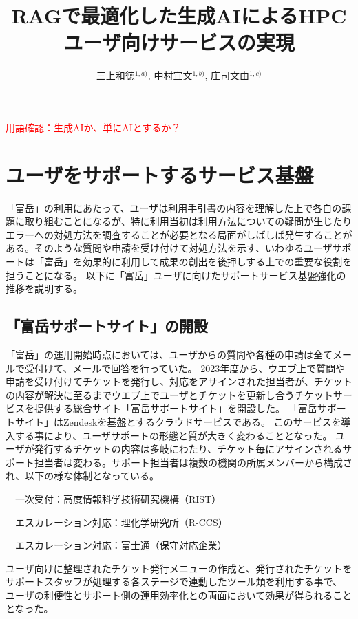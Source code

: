 \documentclass{jsaxiesproc}
\title{
	RAGで最適化した生成AIによるHPCユーザ向けサービスの実現
}
\author{
三上和徳$^{1,a)}$,
中村宜文$^{1,b)}$,
庄司文由$^{1,c)}$
}
\affiliation{
1) 理化学研究所 計算科学研究センター
}
\begin{document}
\maketitle


\textcolor{red}{
用語確認：生成AIか、単にAIとするか？
}



\section{ユーザをサポートするサービス基盤}
「富岳」の利用にあたって、ユーザは利用手引書の内容を理解した上で各自の課題に取り組むことになるが、特に利用当初は利用方法についての疑問が生じたりエラーへの対処方法を調査することが必要となる局面がしばしば発生することがある。そのような質問や申請を受け付けて対処方法を示す、いわゆるユーザサポートは「富岳」を効果的に利用して成果の創出を後押しする上での重要な役割を担うことになる。
以下に「富岳」ユーザに向けたサポートサービス基盤強化の推移を説明する。

\subsection{「富岳サポートサイト」の開設}

「富岳」の運用開始時点においては、ユーザからの質問や各種の申請は全てメールで受付けて、メールで回答を行っていた。
2023年度から、ウエブ上で質問や申請を受け付けてチケットを発行し、対応をアサインされた担当者が、チケットの内容が解決に至るまでウエブ上でユーザとチケットを更新し合うチケットサービスを提供する総合サイト「富岳サポートサイト」を開設した。
「富岳サポートサイト」はZendeskを基盤とするクラウドサービスである。
このサービスを導入する事により、ユーザサポートの形態と質が大きく変わることとなった。
ユーザが発行するチケットの内容は多岐にわたり、チケット毎にアサインされるサポート担当者は変わる。サポート担当者は複数の機関の所属メンバーから構成され、以下の様な体制となっている。

\begin{description}
\item　一次受付：高度情報科学技術研究機構（RIST）
\item　エスカレーション対応：理化学研究所（R-CCS）
\item　エスカレーション対応：富士通（保守対応企業）
\end{description}

ユーザ向けに整理されたチケット発行メニューの作成と、発行されたチケットをサポートスタッフが処理する各ステージで連動したツール類を利用する事で、
ユーザの利便性とサポート側の運用効率化との両面において効果が得られることとなった。
\end{document}
